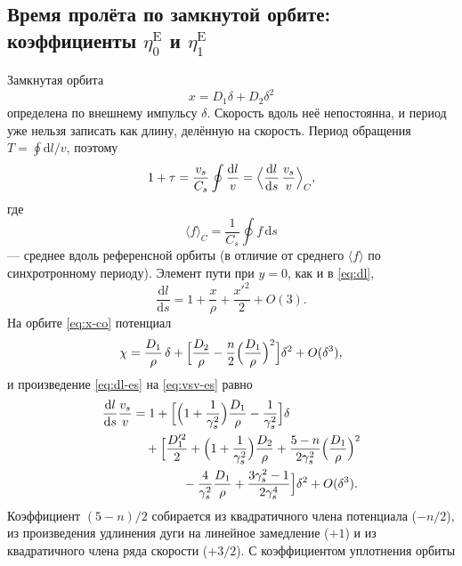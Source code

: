 \subsection{Время пролёта по замкнутой орбите: коэффициенты $\eta_0^{\mathrm{E}}$ и $\eta_1^{\mathrm{E}}$}

Замкнутая орбита
\begin{equation}
\label{eq:x-co}
x=D_1\delta+D_2\delta^2
\end{equation}
определена по внешнему импульсу $\delta$. Скорость вдоль неё непостоянна, и период уже нельзя записать как длину, делённую на скорость. Период обращения $T=\oint\mathrm{d}l/v$, поэтому
\begin{equation}
\label{eq:T-oint}
1+\tau=\frac{v_s}{C_s}\oint\frac{\mathrm{d}l}{v}
=\Bigl\langle\frac{\mathrm{d}l}{\mathrm{d}s}\,\frac{v_s}{v}\Bigr\rangle_C,
\end{equation}
где
\begin{equation}
\label{eq:avg-C}
\langle f\rangle_C=\frac{1}{C_s}\oint f\,\mathrm{d}s
\end{equation}
--- среднее вдоль референсной орбиты (в отличие от среднего $\langle f\rangle$ по синхротронному периоду). Элемент пути при $y=0$, как и в \eqref{eq:dl},
\begin{equation}
\label{eq:dl-es}
\frac{\mathrm{d}l}{\mathrm{d}s}
=1+\frac{x}{\rho}+\frac{x'^2}{2}+O(3).
\end{equation}
На орбите \eqref{eq:x-co} потенциал
\begin{equation}
\label{eq:psi-co}
\chi
=\frac{D_1}{\rho}\,\delta
+\Bigl[\frac{D_2}{\rho}-\frac{n}{2}\Bigl(\frac{D_1}{\rho}\Bigr)^2\Bigr]\delta^2
+O(\delta^3),
\end{equation}
и произведение \eqref{eq:dl-es} на \eqref{eq:vsv-es} равно
\begin{equation}
\label{eq:integrand}
\begin{aligned}
\frac{\mathrm{d}l}{\mathrm{d}s}\frac{v_s}{v}
&=1+\Bigl[
\Bigl(1+\frac{1}{\gamma_s^2}\Bigr)\frac{D_1}{\rho}
-\frac{1}{\gamma_s^2}
\Bigr]\delta
\\
&\quad+\Bigl[
\frac{D_1'^2}{2}
+\Bigl(1+\frac{1}{\gamma_s^2}\Bigr)\frac{D_2}{\rho}
+\frac{5-n}{2\gamma_s^2}\Bigl(\frac{D_1}{\rho}\Bigr)^2
\\
&\qquad\qquad
-\frac{4}{\gamma_s^2}\frac{D_1}{\rho}
+\frac{3\gamma_s^2-1}{2\gamma_s^4}
\Bigr]\delta^2
+O(\delta^3).
\end{aligned}
\end{equation}
Коэффициент $(5-n)/2$ собирается из квадратичного члена потенциала ($-n/2$), из произведения удлинения дуги на линейное замедление ($+1$) и из квадратичного члена ряда скорости ($+3/2$). С коэффициентом уплотнения орбиты

